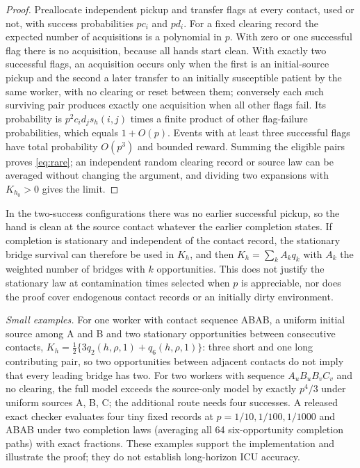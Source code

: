 \documentclass[11pt]{article}
\begin{document}
\begin{proof}
Preallocate independent pickup and transfer flags at every contact, used or not,
with success probabilities $pc_i$ and $pd_i$. For a fixed clearing record the
expected number of acquisitions is a polynomial in $p$. With zero or one
successful flag there is no acquisition, because all hands start clean. With
exactly two successful flags, an acquisition occurs only when the first is an
initial-source pickup and the second a later transfer to an initially
susceptible patient by the same worker, with no clearing or reset between them;
conversely each such surviving pair produces exactly one acquisition when all
other flags fail. Its probability is $p^2c_id_js_h(i,j)$ times a finite product of
other flag-failure probabilities, which equals $1+O(p)$. Events with at least
three successful flags have total probability $O(p^3)$ and bounded reward.
Summing the eligible pairs proves \eqref{eq:rare}; an independent random clearing
record or source law can be averaged without changing the argument, and dividing
two expansions with $K_{h_0}>0$ gives the limit.
\end{proof}
In the two-success configurations there was no earlier successful pickup, so the
hand is clean at the source contact whatever the earlier completion states. If
completion is stationary and independent of the contact record, the stationary
bridge survival can therefore be used in $K_h$, and then $K_h=\sum_kA_kq_k$ with
$A_k$ the weighted number of bridges with $k$ opportunities. This does not
justify the stationary law at contamination times selected when $p$ is
appreciable, nor does the proof cover endogenous contact records or an initially
dirty environment.

\emph{Small examples.} For one worker with contact sequence ABAB, a uniform
initial source among A and B and two stationary opportunities between consecutive
contacts, $K_h=\tfrac12\{3q_2(h,\rho,1)+q_6(h,\rho,1)\}$: three short and one long
contributing pair, so two opportunities between adjacent contacts do not imply
that every leading bridge has two. For two workers with sequence
$A_uB_uB_vC_v$ and no clearing, the full model exceeds the source-only model by
exactly $p^4/3$ under uniform sources A, B, C; the additional route needs four
successes. A released exact checker evaluates four tiny fixed records at
$p=1/10,1/100,1/1000$ and ABAB under two completion laws (averaging all 64
six-opportunity completion paths) with exact fractions. These examples support
the implementation and illustrate the proof; they do not establish long-horizon
ICU accuracy.
\end{document}
